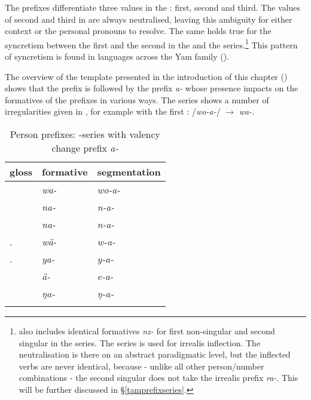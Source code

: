 The prefixes differentiate three  values in the : first, second and third. The values of second and third  in  are always neutralised, leaving this ambiguity for either context or the personal pronouns to resolve. The same holds true for the syncretism between the first  and the second  in the \Alph{} and the \Gam{} series.\footnote{ also includes identical formatives \emph{nz-} for first non-singular and second singular in the \Bet{} series. The \Bet{} series is used for irrealis inflection. The neutralisation is there on an abstract paradigmatic level, but the inflected verbs are never identical, because - unlike all other person/number combinations - the second singular does not take the irrealis prefix \emph{ra-}. This will be further discussed in \S{}\ref{tamprefixseries}.} This pattern of syncretism is found in languages across the Yam family (\citealt{Evans:sng}).%

The overview of the  template presented in the introduction of this chapter () shows that the  prefix is followed by the  prefix \emph{a-} whose presence impacts on the formatives of the  prefixes in various ways. The \Alph{} series shows a number of irregularities given in , for example with the first : /\emph{wo-a-}/ $\rightarrow$ \emph{wa-}.

\begin{table}
\caption{Person prefixes: \Alph-series with valency change prefix \emph{a-}}
\label{persprefwithvalencychange}
	\begin{tabularx}{\textwidth}{XXl}
		\lsptoprule
		{gloss} &{formative} &{segmentation}\\\midrule
		\Fsg &\emph{wa-} &\emph{wo-a-}\\
		\Fnsg &\emph{na-} &\emph{n-a-}\\
		\Ssg &\emph{na-} &\emph{n-a-}\\
		\Tsg.\F	&\emph{wä-} &\emph{w-a-}\\
		\Tsg.\Masc &\emph{ya-} &\emph{y-a-}\\
		\Stnsg &\emph{ä-} &\emph{e-a-}\footnotemark\\
		\M &\emph{ŋa-} &\emph{ŋ-a-}\\
		\lspbottomrule
	\end{tabularx}
\end{table}%

